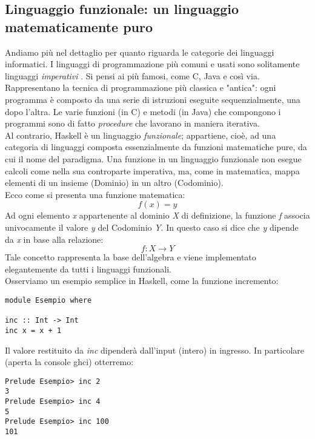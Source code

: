\subsection{Linguaggio funzionale: un linguaggio matematicamente puro}
Andiamo più nel dettaglio per quanto riguarda le categorie dei linguaggi informatici. I linguaggi di programmazione più comuni e usati sono solitamente linguaggi  \textit{imperativi} . Si pensi ai più famosi, come C, Java e così via. Rappresentano la tecnica di programmazione più classica e "antica": ogni programma è composto da una serie di istruzioni eseguite sequenzialmente, una dopo l'altra. Le varie funzioni (in C) e metodi (in Java) che compongono i programmi sono di fatto \textit{procedure} che lavorano in maniera iterativa.\\
Al contrario, Haskell è un linguaggio \textit{funzionale}; appartiene, cioè, ad una categoria di linguaggi  composta essenzialmente da funzioni matematiche pure, da cui il nome del paradigma. Una funzione in un linguaggio funzionale non esegue calcoli come nella sua controparte imperativa, ma, come in matematica, mappa elementi di un insieme (Dominio) in un altro (Codominio).\\
Ecco come si presenta una funzione matematica:
\begin{equation}
f(x) = y
\end{equation}
Ad ogni elemento \textit{x} appartenente al dominio \textit{X} di definizione, la funzione \textit{f} associa univocamente il valore \textit{y} del Codominio \textit{Y}. In questo caso si dice che \textit{y} dipende da \textit{x} in base alla relazione:
\begin{equation}
f:X \to Y
\end{equation}
Tale concetto rappresenta la base dell'algebra e viene implementato elegantemente da tutti i linguaggi funzionali.\\
\newpage
Osserviamo un esempio semplice in Haskell, come la funzione incremento:
\begin{verbatim}
module Esempio where

inc :: Int -> Int 
inc x = x + 1
\end{verbatim}
Il valore restituito da \textit{inc} dipenderà dall'input (intero) in ingresso. In particolare (aperta la console ghci) otterremo:
\begin{verbatim}
Prelude Esempio> inc 2
3
Prelude Esempio> inc 4
5
Prelude Esempio> inc 100
101
\end{verbatim}
